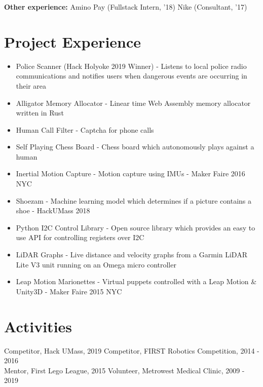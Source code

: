 \documentclass[10pt]{article}
\begin{document}
\begin{flushleft}


    \textbf{Other experience:} Amino Pay (Fullstack Intern, '18) Nike (Consultant, '17)

\section{Project Experience}
    \begin{itemize}
        \item Police Scanner (Hack Holyoke 2019 Winner) - Listens to local police radio communications and notifies users when dangerous events are occurring in their area

        \item Alligator Memory Allocator - Linear time Web Assembly memory allocator written in Rust
    
		\item Human Call Filter - Captcha for phone calls

		\item Self Playing Chess Board - Chess board which autonomously plays against a human

		\item Inertial Motion Capture - Motion capture using IMUs - Maker Faire 2016 NYC

		\item Shoezam - Machine learning model which determines if a picture contains a shoe - HackUMass 2018

		\item Python I2C Control Library - Open source library which provides an easy to use API for controlling 
			registers over I2C

		\item LiDAR Graphs - Live distance and velocity graphs from a Garmin LiDAR Lite V3 unit running on an 
			Omega micro controller

		\item Leap Motion Marionettes - Virtual puppets controlled with a Leap Motion \& Unity3D - Maker Faire 2015 NYC
	\end{itemize}

\section{Activities}
	Competitor, Hack UMass, 2019 \hfill Competitor, FIRST Robotics Competition, 2014 - 2016 \\
	Mentor, First Lego League, 2015 \hfill Volunteer, Metrowest Medical Clinic, 2009 - 2019


\end{flushleft}
\end{document}
